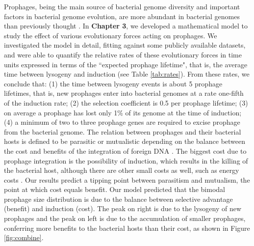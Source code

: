 Prophages, being the main source of bacterial genome diversity and important factors in bacterial genome evolution, are more abundant in bacterial genomes than previously thought \cite{costa_genomic_2018, mottawea_salmonella_2018}. In \textbf{Chapter 3}, we developed a mathematical model to study the effect of various evolutionary forces acting on prophages. We investigated the model in detail, fitting against some publicly available datasets, and were able to quantify the relative rates of these evolutionary forces in time units expressed in terms of the ``expected prophage lifetime", that is, the average time between lysogeny and induction (see Table \ref{tab:rates}). From these rates, we conclude that:   (1) the time between lysogeny events is about 5 prophage lifetimes, that is, new prophages enter into bacterial genomes at a rate one-fifth of the induction rate; (2) the selection coefficient is 0.5 per prophage lifetime;  (3) on average a prophage has lost only 1\% of its genome at the time of induction; (4) a minimum of two to three prophage genes are required to excise prophage from the bacterial genome.  The relation between prophages and their bacterial hosts is defined to be parasitic or mutualistic depending on the balance between the cost and benefits of the integration of foreign DNA \cite{shapiro_evolution_2018}. The biggest cost due to prophage integration is the possibility of induction, which results in the killing of the bacterial host, although there are other small costs as well, such as energy costs \cite{koonin_evolution_2009}. Our results predict a tipping point between parasitism and mutualism, the point at which cost equals benefit. Our model predicted that the bimodal prophage size distribution is due to the balance between selective advantage (benefit) and induction (cost). The peak on right is due to the lysogeny of new prophages and the peak on left is due to the accumulation of smaller prophages, conferring more benefits to the bacterial hosts than their cost, as shown in Figure \ref{fig:combine}. 

